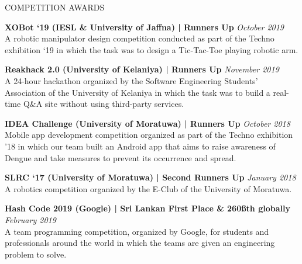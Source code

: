 \documentclass{cv}
\begin{document}
\begin{rSection}{COMPETITION AWARDS}
{        {\bf XOBot `19 (IESL \& University of Jaffna) | Runners Up}                     \hfill {\em October 2019}
        \\A robotic manipulator design competition conducted as part of the Techno exhibition `19 in which the task was to design a Tic-Tac-Toe playing robotic arm.\par

        {\bf Reakhack 2.0 (University of Kelaniya) | Runners Up}                        \hfill {\em November 2019}
        \\A 24-hour hackathon organized by the Software Engineering Students’ Association of the University of Kelaniya in which the task was to build a real-time Q\&A site without using third-party services.\par

        {\bf IDEA Challenge (University of Moratuwa) | Runners Up}                      \hfill {\em October 2018}
        \\Mobile app development competition organized as part of the Techno exhibition '18 in which our team built an Android app that aims to raise awareness of Dengue and take measures to prevent its occurrence and spread.\par

        {\bf SLRC `17 (University of Moratuwa) | Second Runners Up} \hfill {\em January 2018}
        \\A robotics competition organized by the E-Club of the University of Moratuwa.\par

        {\bf Hash Code 2019 (Google) | Sri Lankan First Place \& 260\ss{th} globally}   \hfill {\em February 2019}
        \\A team programming competition, organized by Google, for students and professionals around the world in which the teams are given an engineering problem to solve. \par

    }\end{rSection}

\end{document}
